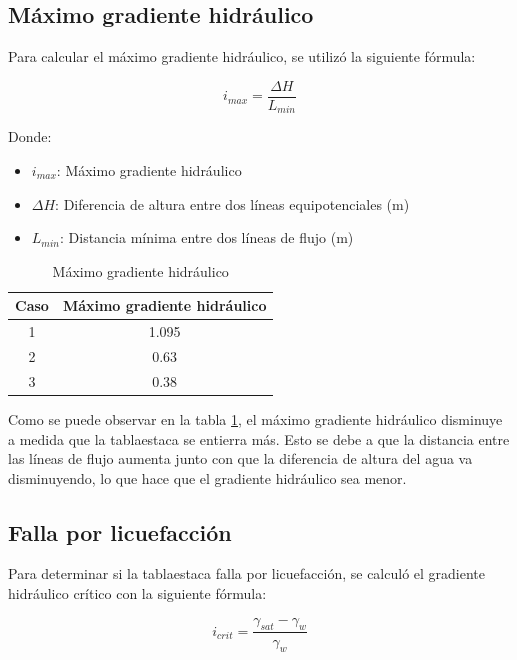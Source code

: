 \documentclass{article}
\begin{document}
\subsection{Máximo gradiente hidráulico}

Para calcular el máximo gradiente hidráulico, se utilizó la siguiente fórmula:

\begin{equation}
  i_{max} = \frac{\Delta H}{L_{min}}
\end{equation}

Donde:
\begin{itemize}
    \item $i_{max}$: Máximo gradiente hidráulico 
    \item $\Delta H$: Diferencia de altura entre dos líneas equipotenciales (m)
    \item $L_{min}$: Distancia mínima entre dos líneas de flujo (m)
\end{itemize}


\begin{table}[h!]
  \centering
  \begin{tabular}{cc}
    \hline
    \textbf{Caso} & \textbf{Máximo gradiente hidráulico} \\
    \hline
    1 & 1.095 \\
    2 & 0.63 \\
    3 & 0.38 \\
    \hline
  \end{tabular}
  \caption{Máximo gradiente hidráulico}
  \label{tab:gradiente}
\end{table}

Como se puede observar en la tabla \ref{tab:gradiente}, el máximo gradiente hidráulico disminuye a medida que la tablaestaca se entierra más. Esto se debe a que la distancia entre las líneas de flujo aumenta junto con que la diferencia de altura del agua va disminuyendo, lo que hace que el gradiente hidráulico sea menor. 

\subsection{Falla por licuefacción}

Para determinar si la tablaestaca falla por licuefacción, se calculó el gradiente hidráulico crítico con la siguiente fórmula:

\begin{equation}
  i_{crit} = \frac{\gamma_{sat}-\gamma_w}{\gamma_w} 
\end{equation}
\end{document}
